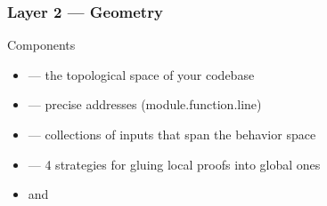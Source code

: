 \begin{frame}
\frametitle{Layer 2 --- Geometry}
\begin{block}{Components}
  \begin{itemize}
    \item {} --- the topological space of your codebase
    \item {} --- precise addresses (module.function.line)
    \item {} --- collections of inputs that span the behavior space
    \item {} --- 4 strategies for gluing local proofs into global ones
    \item {} and 
  \end{itemize}
\end{block}
\vfill
\begin{center}
\end{center}
\end{frame}

